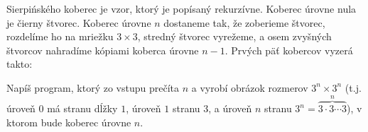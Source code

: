 \begin{uloha}
  \def\sierp#1{
    \def\tre{0.333333333}
    \if#10
    \filldraw(0,0) rectangle (1,1);
    \else
    \foreach \x in {0,...,2}
    \foreach \y in {0,...,2} {
      \pgfmathparse{\x==1 && \y==1?int(1):int(0)}
      \ifnum\pgfmathresult=0{
        \begin{scope}[shift={(\tre*\x,\tre*\y)}, scale=\tre]
          \pgfmathtruncatemacro{\n}{#1-1}
          \sierp{\n}
        \end{scope}
      }
      \fi
    }
    \fi 
  }

  Sierpińského koberec je vzor, ktorý je popísaný rekurzívne. Koberec úrovne nula
  je čierny štvorec. Koberec úrovne $n$ dostaneme tak, že zoberieme štvorec, rozdelíme
  ho na mriežku $3\times3$, stredný štvorec vyrežeme, a osem zvyšných štvorcov nahradíme
  kópiami koberca úrovne $n-1$. Prvých päť kobercov vyzerá takto:

  

  
  Napíš program, ktorý zo vstupu prečíta $n$ a vyrobí obrázok rozmerov
  $3^n\times3^n$ (t.j. úroveň 0 má stranu dĺžky $1$, úroveň $1$ stranu $3$,
  a úroveň $n$ stranu $3^n=\overbrace{3\cdot3\cdots3}^n$), v ktorom bude koberec úrovne $n$.
\end{uloha}

